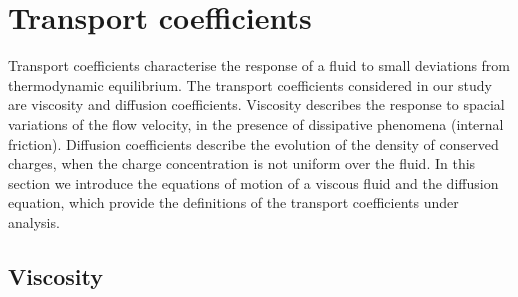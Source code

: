 
\section{Transport coefficients}

Transport coefficients characterise the response of a fluid to small deviations from thermodynamic equilibrium. The transport coefficients considered in our study are viscosity and diffusion coefficients. Viscosity describes the response to spacial variations of the flow velocity, in the presence of dissipative phenomena (internal friction). Diffusion coefficients describe the evolution of the density of conserved charges, when the charge concentration is not uniform over the fluid. In this section we introduce the equations of motion of a viscous fluid and the diffusion equation, which provide the definitions of the transport coefficients under analysis.

\subsection{Viscosity}

